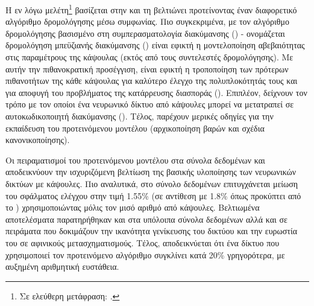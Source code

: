 Η εν λόγω μελέτη\footnote{Σε ελεύθερη μετάφραση: .}\cite{De_Sousa_Ribeiro_Leontidis_Kollias_2020_Capsule_Routing} βασίζεται στην \cite{hinton2018matrix} και τη βελτιώνει προτείνοντας έναν διαφορετικό αλγόριθμο δρομολόγησης μέσω συμφωνίας. Πιο συγκεκριμένα, με τον αλγόριθμο δρομολόγησης βασισμένο στη συμπερασματολογία διακύμανσης () - ονομάζεται δρομολόγηση μπεϋζιανής διακύμανσης () είναι εφικτή η μοντελοποίηση αβεβαιότητας στις παραμέτρους της κάψουλας (εκτός από τους συντελεστές δρομολόγησης). Με αυτήν την πιθανοκρατική προσέγγιση, είναι εφικτή η τροποποίηση των πρότερων πιθανοτήτων της κάθε κάψουλας για καλύτερο έλεγχο της πολυπλοκότητάς τους και για αποφυγή του προβλήματος της κατάρρευσης διασποράς (). Επιπλέον, δείχνουν τον τρόπο με τον οποίοι ένα νευρωνικό δίκτυο από κάψουλες μπορεί να μετατραπεί σε αυτο\textendash κωδικοποιητή διακύμανσης (). Τέλος, παρέχουν μερικές οδηγίες για την εκπαίδευση του προτεινόμενου μοντέλου (αρχικοποίηση βαρών και σχέδια κανονικοποίησης). \par

Οι πειραματισμοί του προτεινόμενου μοντέλου στα σύνολα δεδομένων  και  αποδεικνύουν την ισχυριζόμενη βελτίωση της βασικής υλοποίησης των νευρωνικών δικτύων με κάψουλες. Πιο αναλυτικά, στο σύνολο δεδομένων \cite{lecun2004learning} επιτυγχάνεται μείωση του σφάλματος ελέγχου στην τιμή 1.55\% (σε αντίθεση με 1.8\% όπως προκύπτει από το \cite{hinton2018matrix}) χρησιμοποιώντας μόλις τον μισό αριθμό από κάψουλες. Βελτιωμένα αποτελέσματα παρατηρήθηκαν και στα υπόλοιπα σύνολα δεδομένων αλλά και σε πειράματα που δοκιμάζουν την ικανότητα γενίκευσης του δικτύου και την ευρωστία του σε αφινικούς μετασχηματισμούς. Τέλος, αποδεικνύεται ότι ένα δίκτυο που χρησιμοποιεί τον προτεινόμενο αλγόριθμο συγκλίνει κατά 20\% γρηγορότερα, με αυξημένη αριθμητική ευστάθεια.


